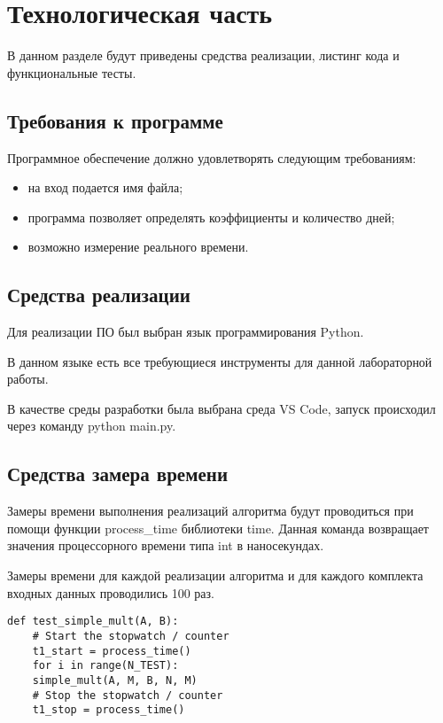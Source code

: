 \chapter{Технологическая часть}
В данном разделе будут приведены средства реализации, листинг кода и функциональные тесты.

\section{Требования к программе}

Программное обеспечение должно удовлетворять следующим требованиям:
\begin{itemize}
	\item на вход подается имя файла;
	\item программа позволяет определять коэффициенты и количество дней;
	\item возможно измерение реального времени.
\end{itemize}

\section{Средства реализации} 
Для реализации ПО был выбран язык программирования Python\cite{python}. 

В данном языке есть все требующиеся инструменты для данной лабораторной работы.

В качестве среды разработки была выбрана среда VS Code\cite{vscode}, запуск происходил через команду python main.py.

\section{Средства замера времени}

Замеры времени выполнения реализаций алгоритма будут проводиться при помощи функции process\_time \cite{test} библиотеки time. Данная команда возвращает значения процессорного времени типа int в наносекундах.

Замеры времени для каждой реализации алгоритма и для каждого комплекта входных данных проводились 100 раз.
\newpage
\begin{lstlisting}[label=bench,caption=Пример замера затраченного времени]
	def test_simple_mult(A, B):
	# Start the stopwatch / counter 
	t1_start = process_time() 
	for i in range(N_TEST):
	simple_mult(A, M, B, N, M)
	# Stop the stopwatch / counter
	t1_stop = process_time()
\end{lstlisting}


